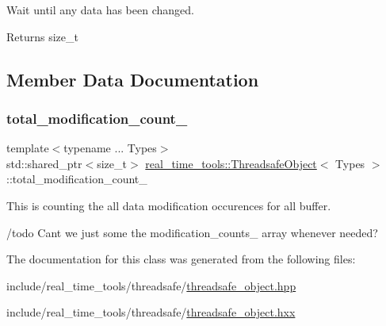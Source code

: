 Wait until any data has been changed. 

\begin{DoxyReturn}{Returns}
size\+\_\+t 
\end{DoxyReturn}


\subsection{Member Data Documentation}
\mbox{\label{classreal__time__tools_1_1ThreadsafeObject_a12f866f5a2f955aa3b55b03623033fca}} 
\subsubsection{\texorpdfstring{total\+\_\+modification\+\_\+count\+\_\+}{total\_modification\_count\_}}
{\footnotesize\ttfamily template$<$typename ... Types$>$ \\
std\+::shared\+\_\+ptr$<$size\+\_\+t$>$ \hyperlink{classreal__time__tools_1_1ThreadsafeObject}{real\+\_\+time\+\_\+tools\+::\+Threadsafe\+Object}$<$ Types $>$\+::total\+\_\+modification\+\_\+count\+\_\+\hspace{0.3cm}{\ttfamily [private]}}



This is counting the all data modification occurences for all buffer. 

/todo Can\textquotesingle{}t we just some the modification\+\_\+counts\+\_\+ array whenever needed? 

The documentation for this class was generated from the following files\+:\begin{DoxyCompactItemize}
\item 
include/real\+\_\+time\+\_\+tools/threadsafe/\hyperlink{threadsafe__object_8hpp}{threadsafe\+\_\+object.\+hpp}\item 
include/real\+\_\+time\+\_\+tools/threadsafe/\hyperlink{threadsafe__object_8hxx}{threadsafe\+\_\+object.\+hxx}\end{DoxyCompactItemize}
